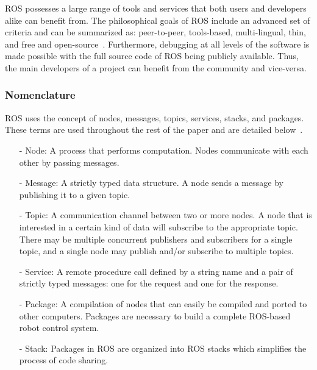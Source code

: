 ROS possesses a large range of tools and services that both users and developers alike can benefit from. The philosophical goals of ROS include an advanced set of criteria and can be summarized as: peer-to-peer, tools-based, multi-lingual, thin, and free and open-source~\cite{QUIGLEY.ICRA.2009}. Furthermore, debugging at all levels of the software is made possible with the full source code of ROS being publicly available. Thus, the main developers of a project can benefit from the community and vice-versa.

\subsubsection*{Nomenclature}
ROS uses the concept of nodes, messages, topics, services, stacks, and packages. These terms are used throughout the rest of the paper and are detailed below~\cite{QUIGLEY.ICRA.2009}.
\begin{itemize}
\item[-] Node: A process that performs computation. Nodes communicate with each other by passing messages.
\item[-] Message: A strictly typed data structure. A node sends a message by publishing it to a given topic.
\item[-] Topic: A communication channel between two or more
nodes. A node that is interested in a certain kind of data will subscribe
to the appropriate topic. There may be multiple concurrent
publishers and subscribers for a single topic, and a single
node may publish and/or subscribe to multiple topics.
\item[-] Service: A remote procedure call defined by a string name and a pair
of strictly typed messages: one for the request and one for
the response.
\item[-] Package: A compilation of nodes that can easily be compiled and ported to other computers. Packages are necessary to build a complete ROS-based robot control system.
\item[-] Stack: Packages in ROS are organized into ROS stacks which simplifies the process of code sharing. 

\end{itemize} 
